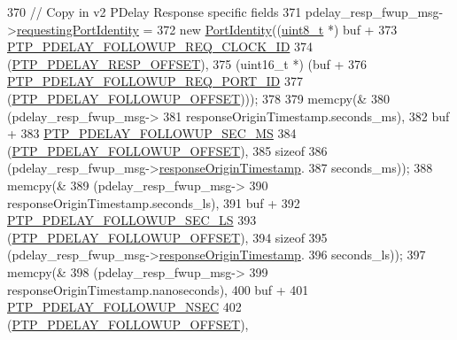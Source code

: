 \begin{DoxyCode}
{{{{{{{{370             \textcolor{comment}{// Copy in v2 PDelay Response specific fields}
371             pdelay\_resp\_fwup\_msg->\hyperlink{class_p_t_p_message_path_delay_resp_follow_up_a27e69c7fb521ebffca13229a7c4658ce}{requestingPortIdentity} =
372                 \textcolor{keyword}{new} \hyperlink{class_port_identity}{PortIdentity}((\hyperlink{stdint_8h_aba7bc1797add20fe3efdf37ced1182c5}{uint8\_t} *) buf +
373                          \hyperlink{avbts__message_8hpp_a888c4d23c6d7221b962cdb21af1c9919}{PTP\_PDELAY\_FOLLOWUP\_REQ\_CLOCK\_ID}
374                          (\hyperlink{avbts__message_8hpp_a7c20f0e32d4408c124fa9e115ab32cf3}{PTP\_PDELAY\_RESP\_OFFSET}),
375                          (uint16\_t *) (buf +
376                                \hyperlink{avbts__message_8hpp_a255d563aa29bae40a58b1855d33155fc}{PTP\_PDELAY\_FOLLOWUP\_REQ\_PORT\_ID}
377                                (\hyperlink{avbts__message_8hpp_af0f41aa83b1011ea5b8c42abddd8cd50}{PTP\_PDELAY\_FOLLOWUP\_OFFSET})));
378 
379             memcpy(&
380                    (pdelay\_resp\_fwup\_msg->
381                 responseOriginTimestamp.seconds\_ms),
382                    buf +
383                    \hyperlink{avbts__message_8hpp_a64120f45af2cdc57df2a73e8867ec2dd}{PTP\_PDELAY\_FOLLOWUP\_SEC\_MS}
384                    (\hyperlink{avbts__message_8hpp_af0f41aa83b1011ea5b8c42abddd8cd50}{PTP\_PDELAY\_FOLLOWUP\_OFFSET}),
385                    \textcolor{keyword}{sizeof}
386                    (pdelay\_resp\_fwup\_msg->\hyperlink{class_p_t_p_message_path_delay_resp_follow_up_ace95ddb3f03eb3b4fcf8f73281dc0ee3}{responseOriginTimestamp}.
387                 seconds\_ms));
388             memcpy(&
389                    (pdelay\_resp\_fwup\_msg->
390                 responseOriginTimestamp.seconds\_ls),
391                    buf +
392                    \hyperlink{avbts__message_8hpp_a9a1f675eb7706c235c9d3bb050683da2}{PTP\_PDELAY\_FOLLOWUP\_SEC\_LS}
393                    (\hyperlink{avbts__message_8hpp_af0f41aa83b1011ea5b8c42abddd8cd50}{PTP\_PDELAY\_FOLLOWUP\_OFFSET}),
394                    \textcolor{keyword}{sizeof}
395                    (pdelay\_resp\_fwup\_msg->\hyperlink{class_p_t_p_message_path_delay_resp_follow_up_ace95ddb3f03eb3b4fcf8f73281dc0ee3}{responseOriginTimestamp}.
396                 seconds\_ls));
397             memcpy(&
398                    (pdelay\_resp\_fwup\_msg->
399                 responseOriginTimestamp.nanoseconds),
400                    buf +
401                    \hyperlink{avbts__message_8hpp_a405e85b9d79337d889c22e4b7959aa84}{PTP\_PDELAY\_FOLLOWUP\_NSEC}
402                    (\hyperlink{avbts__message_8hpp_af0f41aa83b1011ea5b8c42abddd8cd50}{PTP\_PDELAY\_FOLLOWUP\_OFFSET}),
}}}}}}}}
\end{DoxyCode}
